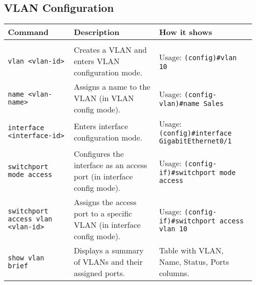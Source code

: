 \documentclass{article}
\begin{document}
\subsection{VLAN Configuration}
\begin{longtable}{>{\raggedright\arraybackslash}p{4cm}|>{\raggedright\arraybackslash}p{7cm}|>{\raggedright\arraybackslash}p{5cm}}
\toprule
\textbf{Command} & \textbf{Description} & \textbf{How it shows} \\
\midrule
\endhead
\midrule
\multicolumn{3}{r}{{Continued on next page}} \\
\midrule
\endfoot
\bottomrule
\endlastfoot
\texttt{vlan <vlan-id>} & Creates a VLAN and enters VLAN configuration mode. & Usage: \texttt{(config)\#vlan 10} \\
\hline
\texttt{name <vlan-name>} & Assigns a name to the VLAN (in VLAN config mode). & Usage: \texttt{(config-vlan)\#name Sales} \\
\hline
\texttt{interface <interface-id>} & Enters interface configuration mode. & Usage: \texttt{(config)\#interface GigabitEthernet0/1} \\
\hline
\texttt{switchport mode access} & Configures the interface as an access port (in interface config mode). & Usage: \texttt{(config-if)\#switchport mode access} \\
\hline
\texttt{switchport access vlan <vlan-id>} & Assigns the access port to a specific VLAN (in interface config mode). & Usage: \texttt{(config-if)\#switchport access vlan 10} \\
\hline
\texttt{show vlan brief} & Displays a summary of VLANs and their assigned ports. & Table with VLAN, Name, Status, Ports columns. \\
\end{longtable}
\end{document}
